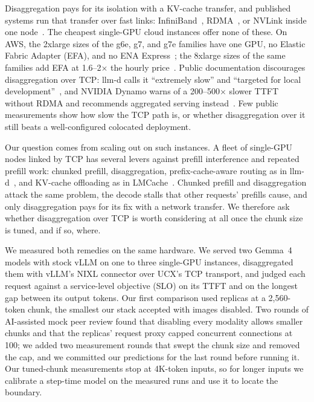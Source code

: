 \documentclass[11pt]{article}
\begin{document}
Disaggregation pays for its isolation with a KV-cache transfer, and published systems run that transfer over fast links: InfiniBand~\cite{splitwise}, RDMA~\cite{mooncake}, or NVLink inside one node~\cite{distserve}. The cheapest single-GPU cloud instances offer none of these. On AWS, the 2xlarge sizes of the g6e, g7, and g7e families have one GPU, no Elastic Fabric Adapter (EFA), and no ENA Express~\cite{awsspecs}; the 8xlarge sizes of the same families add EFA at 1.6--2$\times$ the hourly price~\cite{awsefa,awspricing}. Public documentation discourages disaggregation over TCP: llm-d calls it ``extremely slow'' and ``targeted for local development''~\cite{llmddocs}, and NVIDIA Dynamo warns of a 200--500$\times$ slower TTFT without RDMA and recommends aggregated serving instead~\cite{dynamodocs}. Few public measurements show how slow the TCP path is, or whether disaggregation over it still beats a well-configured colocated deployment.

Our question comes from scaling out on such instances. A fleet of single-GPU nodes linked by TCP has several levers against prefill interference and repeated prefill work: chunked prefill, disaggregation, prefix-cache-aware routing as in llm-d~\cite{llmdarch}, and KV-cache offloading as in LMCache~\cite{lmcache}. Chunked prefill and disaggregation attack the same problem, the decode stalls that other requests' prefills cause, and only disaggregation pays for its fix with a network transfer. We therefore ask whether disaggregation over TCP is worth considering at all once the chunk size is tuned, and if so, where.

We measured both remedies on the same hardware. We served two Gemma~4 models with stock vLLM on one to three single-GPU instances, disaggregated them with vLLM's NIXL connector over UCX's TCP transport, and judged each request against a service-level objective (SLO) on its TTFT and on the longest gap between its output tokens. Our first comparison used replicas at a 2,560-token chunk, the smallest our stack accepted with images disabled. Two rounds of AI-assisted mock peer review found that disabling every modality allows smaller chunks and that the replicas' request proxy capped concurrent connections at 100; we added two measurement rounds that swept the chunk size and removed the cap, and we committed our predictions for the last round before running it. Our tuned-chunk measurements stop at 4K-token inputs, so for longer inputs we calibrate a step-time model on the measured runs and use it to locate the boundary.
\end{document}
